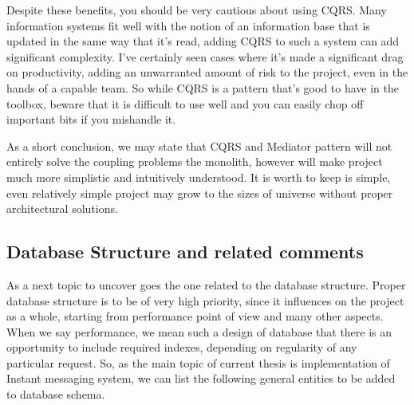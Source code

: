 Despite these benefits, you should be very cautious about using CQRS.
Many information systems fit well with the notion of an information base that is updated in the same way that it's read,
adding CQRS to such a system can add significant complexity.
I've certainly seen cases where it's made a significant drag on productivity, adding an unwarranted amount of risk to the
project, even in the hands of a capable team.
So while CQRS is a pattern that's good to have in the toolbox, beware that it is difficult to use well and you can easily
chop off important bits if you mishandle it.

As a short conclusion, we may state that CQRS and Mediator pattern will not entirely solve the coupling problems the monolith,
however will make project much more simplistic and intuitively understood.
It is worth to keep is simple,
even relatively simple project may grow to the sizes of universe without proper architectural solutions.

\subsection{Database Structure and related comments}\label{subsec:database-structure-and-related-comments}
As a next topic to uncover goes the one related to the database structure.
Proper database structure is to be of very high priority, since it influences on the project as a whole,
starting from performance point of view and many other aspects.
When we say performance, we mean such a design of database that there is an opportunity to include required indexes,
depending on regularity of any particular request.
So, as the main topic of current thesis is implementation of Instant messaging system, we can list the following
general entities to be added to database schema.

